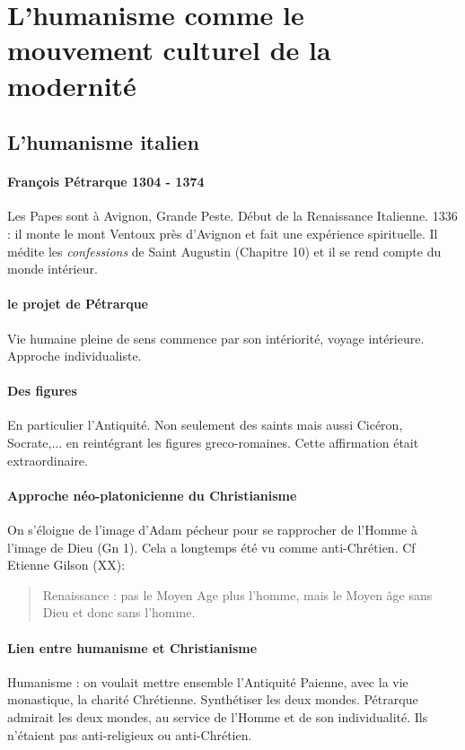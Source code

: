 \section{L’humanisme comme le mouvement culturel de la modernité } 

\subsection{L’humanisme italien}   

\paragraph{François Pétrarque 1304 - 1374} Les Papes sont à Avignon, Grande Peste. Début de la Renaissance Italienne. 1336 : il monte le mont Ventoux près d'Avignon et fait une expérience spirituelle. Il médite les \textit{confessions} de Saint Augustin (Chapitre 10) et il se rend compte du monde intérieur.

\paragraph{le projet de Pétrarque} Vie humaine pleine de sens commence par son intériorité, voyage intérieure. Approche individualiste. 
\paragraph{Des figures } En particulier l'Antiquité. Non seulement des saints mais aussi Cicéron, Socrate,... en reintégrant les figures greco-romaines.
Cette affirmation était extraordinaire.

\paragraph{Approche néo-platonicienne du Christianisme} On s'éloigne de l'image d'Adam pécheur pour se rapprocher de l'Homme à l'image de Dieu (Gn 1).  Cela a longtemps été vu comme anti-Chrétien. Cf Etienne Gilson (XX):
\begin{quote}
    Renaissance : pas le Moyen Age plus l'homme, mais le Moyen âge sans Dieu et donc sans l'homme.
\end{quote}

\paragraph{Lien entre humanisme et Christianisme} Humanisme : on voulait mettre ensemble l'Antiquité Paienne, avec la vie monastique, la charité Chrétienne. Synthétiser les deux mondes. Pétrarque admirait les deux mondes, au service de l'Homme et de son individualité. Ils n'étaient pas anti-religieux ou anti-Chrétien. 

